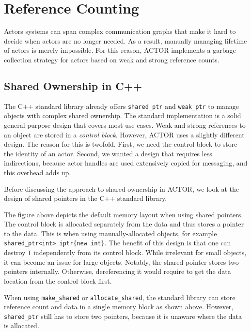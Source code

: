 \section{Reference Counting}
\label{reference-counting}

Actors systems can span complex communication graphs that make it hard to
decide when actors are no longer needed. As a result, manually managing
lifetime of actors is merely impossible. For this reason, ACTOR implements a
garbage collection strategy for actors based on weak and strong reference
counts.

\subsection{Shared Ownership in C++}

The C++ standard library already offers \lstinline^shared_ptr^ and
\lstinline^weak_ptr^ to manage objects with complex shared ownership. The
standard implementation is a solid general purpose design that covers most use
cases. Weak and strong references to an object are stored in a \emph{control
block}. However, ACTOR uses a slightly different design. The reason for this is
twofold. First, we need the control block to store the identity of an actor.
Second, we wanted a design that requires less indirections, because actor
handles are used extensively copied for messaging, and this overhead adds up.

Before discussing the approach to shared ownership in ACTOR, we look at the
design of shared pointers in the C++ standard library.


The figure above depicts the default memory layout when using shared pointers.
The control block is allocated separately from the data and thus stores a
pointer to the data. This is when using manually-allocated objects, for example
\lstinline^shared_ptr<int> iptr{new int}^. The benefit of this design is that
one can destroy \lstinline^T^ independently from its control block. While
irrelevant for small objects, it can become an issue for large objects.
Notably, the shared pointer stores two pointers internally. Otherwise,
dereferencing it would require to get the data location from the control block
first.


When using \lstinline^make_shared^ or \lstinline^allocate_shared^, the standard
library can store reference count and data in a single memory block as shown
above. However, \lstinline^shared_ptr^ still has to store two pointers, because
it is unaware where the data is allocated.

